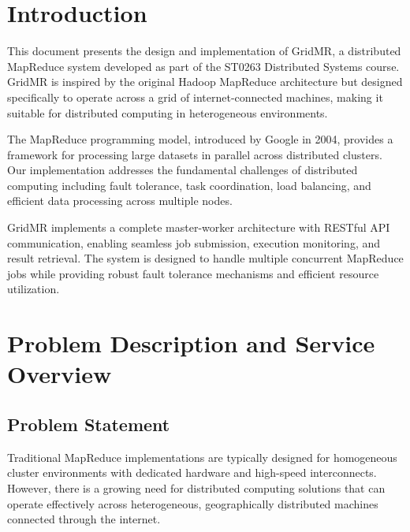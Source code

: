 \documentclass[11pt,letterpaper,oneside]{article}
\begin{document}


\tableofcontents

\iftotalfigures
    \listoffigures
\fi

\listoftables

\clearpage

\section{Introduction}

This document presents the design and implementation of GridMR, a distributed MapReduce system developed as part of the ST0263 Distributed Systems course. GridMR is inspired by the original Hadoop MapReduce architecture but designed specifically to operate across a grid of internet-connected machines, making it suitable for distributed computing in heterogeneous environments.

The MapReduce programming model, introduced by Google in 2004, provides a framework for processing large datasets in parallel across distributed clusters. Our implementation addresses the fundamental challenges of distributed computing including fault tolerance, task coordination, load balancing, and efficient data processing across multiple nodes.

GridMR implements a complete master-worker architecture with RESTful API communication, enabling seamless job submission, execution monitoring, and result retrieval. The system is designed to handle multiple concurrent MapReduce jobs while providing robust fault tolerance mechanisms and efficient resource utilization.


\section{Problem Description and Service Overview}

\subsection{Problem Statement}

Traditional MapReduce implementations are typically designed for homogeneous cluster environments with dedicated hardware and high-speed interconnects. However, there is a growing need for distributed computing solutions that can operate effectively across heterogeneous, geographically distributed machines connected through the internet.
\end{document}
